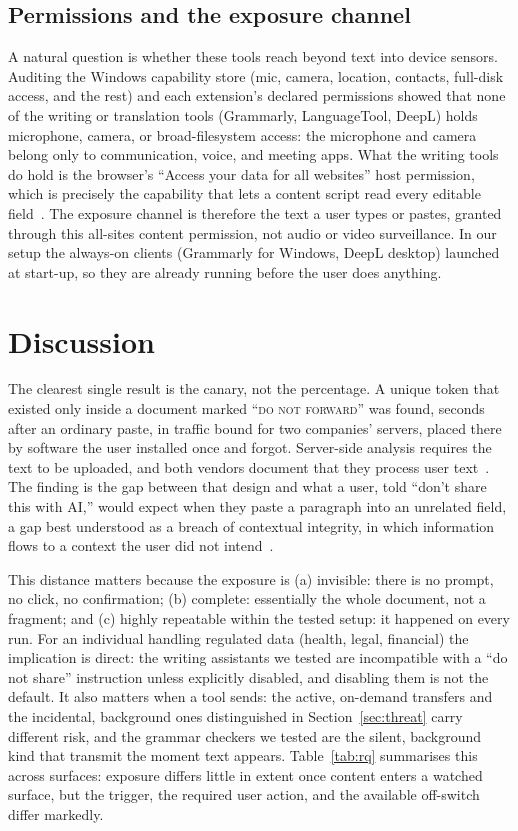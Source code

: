 \documentclass[10pt,conference,a4paper]{IEEEtran}
\begin{document}
\subsection{Permissions and the exposure channel}
\label{sec:permissions}

A natural question is whether these tools reach beyond text into device sensors. Auditing
the Windows capability store (mic, camera, location, contacts, full-disk access, and the
rest) and each extension's declared permissions showed that none of the writing or
translation tools (Grammarly, LanguageTool, DeepL) holds microphone, camera, or
broad-filesystem access: the microphone and camera belong only to communication, voice,
and meeting apps. What the writing tools do hold is the browser's ``Access your data for all
websites'' host permission, which is precisely the capability
that lets a content script read every editable field~\citep{mozilla2024permissions}. The
exposure channel is therefore the text a user types or pastes, granted through this
all-sites content permission, not audio or video surveillance. In our setup the always-on
clients (Grammarly for Windows, DeepL desktop) launched at start-up, so they are already
running before the user does anything.

\section{Discussion}
\label{sec:discussion}

The clearest single result is the canary, not the percentage. A unique
token that existed only inside a document marked ``\textsc{do not forward}'' was found,
seconds after an ordinary paste, in traffic bound for two companies' servers, placed
there by software the user installed once and forgot. Server-side analysis requires the
text to be uploaded, and both vendors
document that they process user text~\citep{grammarly2025privacy,languagetool2025privacy}.
The finding is the gap between that design and what a user, told ``don't share this with
AI,'' would expect when they paste a paragraph into an unrelated field, a gap best
understood as a breach of contextual integrity, in which information flows to a context the
user did not intend~\citep{nissenbaum2004contextual}.

This distance matters because the exposure is (a) invisible: there is no prompt, no
click, no confirmation; (b) complete: essentially the whole document, not a
fragment; and (c) highly repeatable within the tested setup: it happened on every run. For
an individual handling regulated data (health, legal, financial) the implication is direct:
the writing assistants we tested are incompatible with a ``do not share''
instruction unless explicitly disabled, and disabling them is not the default. It also
matters when a tool sends: the active, on-demand transfers and the incidental, background
ones distinguished in Section~\ref{sec:threat} carry different risk, and the grammar
checkers we tested are the silent, background kind that transmit the moment text appears.
Table~\ref{tab:rq} summarises this across surfaces: exposure differs little in extent once
content enters a watched surface, but the trigger, the required user action, and the
available off-switch differ markedly.
\end{document}

